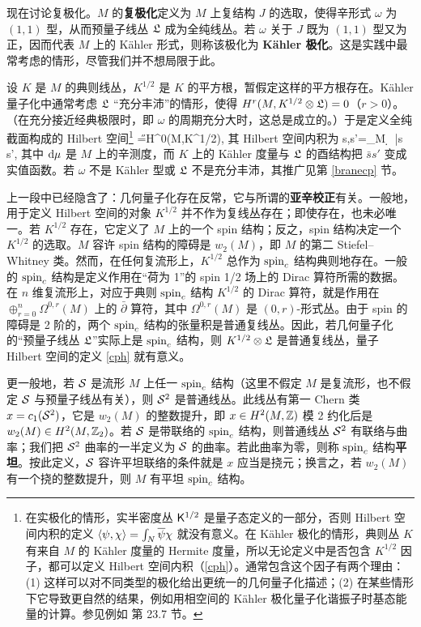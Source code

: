 现在讨论复极化。$M$ 的\textbf{复极化}定义为 $M$ 上复结构 $J$ 的选取，使得辛形式 $\omega$ 为 $(1,1)$ 型，从而预量子线丛 ${\mathfrak L}$ 成为全纯线丛。若 $\omega$ 关于 $J$ 既为 $(1,1)$ 型又为正，因而代表 $M$ 上的 Kähler 形式，则称该极化为 \textbf{Kähler 极化}。这是实践中最常考虑的情形，尽管我们并不想局限于此。

设 $K$ 是 $M$ 的典则线丛，$K^{1/2}$ 是 $K$ 的平方根，暂假定这样的平方根存在。Kähler 量子化中通常考虑 ${\mathfrak L}$ “充分丰沛”的情形，使得 $H^r(M,K^{1/2}\otimes {\mathfrak L})=0$（$r>0$）。（在充分接近经典极限时，即 $\omega$ 的周期充分大时，这总是成立的。）于是定义全纯截面构成的 Hilbert 空间\footnote{在实极化的情形，实半密度丛 ${\sf K}^{1/2}$ 是量子态定义的一部分，否则 Hilbert 空间内积的定义 $\langle\psi,\chi\rangle=\int_N\overline\psi\chi$ 就没有意义。在 Kähler 极化的情形，典则丛 $K$ 有来自 $M$ 的 Kähler 度量的 Hermite 度量，所以无论定义中是否包含 $K^{1/2}$ 因子，都可以定义 Hilbert 空间内积（\ref{cph}）。通常包含这个因子有两个理由：(1) 这样可以对不同类型的极化给出更统一的几何量子化描述；(2) 在某些情形下它导致更自然的结果，例如用相空间的 Kähler 极化量子化谐振子时基态能量的计算。参见例如 \cite{Hall} 第 23.7 节。}
\be\label{cph}\H=H^0(M,K^{1/2}\otimes \frL),\ee
其 Hilbert 空间内积为
\be\label{inpro}\la s,s'\ra=\int_M \d\mu \, \bar s s',\ee
其中 ${\mathrm d}\mu$ 是 $M$ 上的辛测度，而 $K$ 上的 Kähler 度量与 ${\mathfrak L}$ 的酉结构把 $\bar s s'$ 变成实值函数。若 $\omega$ 不是 Kähler 型或 ${\mathfrak L}$ 不是充分丰沛，其推广见第 \ref{branecp} 节。

上一段中已经隐含了：几何量子化存在反常，它与所谓的\textbf{亚辛校正}有关。一般地，用于定义 Hilbert 空间的对象 $K^{1/2}$ 并不作为复线丛存在；即使存在，也未必唯一。若 $K^{1/2}$ 存在，它定义了 $M$ 上的一个 spin 结构；反之，spin 结构决定一个 $K^{1/2}$ 的选取。$M$ 容许 spin 结构的障碍是 $w_2(M)$，即 $M$ 的第二 Stiefel--Whitney 类。然而，在任何复流形上，$K^{1/2}$ 总作为 ${\mathrm{spin}_c}$ 结构典则地存在。一般的 ${\mathrm{spin}_c}$ 结构是定义作用在“荷为 1”的 spin 1/2 场上的 Dirac 算符所需的数据。在 $n$ 维复流形上，对应于典则 ${\mathrm{spin}_c}$ 结构 $K^{1/2}$ 的 Dirac 算符，就是作用在 $\oplus_{r=0}^n\Omega^{0,r}(M)$ 上的 $\bar\partial$ 算符，其中 $\Omega^{0,r}(M)$ 是 $(0,r)$-形式丛。由于 spin 的障碍是 2 阶的，两个 ${\mathrm{spin}_c}$ 结构的张量积是普通复线丛。因此，若几何量子化的“预量子线丛 ${\mathfrak L}$”实际上是 ${\mathrm{spin}_c}$ 结构，则 $K^{1/2}\otimes {\mathfrak L}$ 是普通复线丛，量子 Hilbert 空间的定义 \eqref{cph} 就有意义。

更一般地，若 ${\mathcal S}$ 是流形 $M$ 上任一 ${\mathrm{spin}_c}$ 结构（这里不假定 $M$ 是复流形，也不假定 ${\mathcal S}$ 与预量子线丛有关），则 ${\mathcal S}^2$ 是普通线丛。此线丛有第一 Chern 类 $x=c_1({\mathcal S}^2)$，它是 $w_2(M)$ 的整数提升，即 $x\in H^2(M,{\mathbb Z})$ 模 2 约化后是 $w_2(M)\in H^2(M,{\mathbb Z}_2)$。若 ${\mathcal S}$ 是带联络的 ${\mathrm{spin}_c}$ 结构，则普通线丛 ${\mathcal S}^2$ 有联络与曲率；我们把 ${\mathcal S}^2$ 曲率的一半定义为 ${\mathcal S}$ 的曲率。若此曲率为零，则称 ${\mathrm{spin}_c}$ 结构\textbf{平坦}。按此定义，${\mathcal S}$ 容许平坦联络的条件就是 $x$ 应当是挠元；换言之，若 $w_2(M)$ 有一个挠的整数提升，则 $M$ 有平坦 ${\mathrm{spin}_c}$ 结构。


